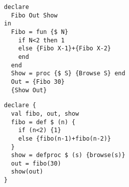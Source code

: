 \begin{lstlisting}[language=oz,label={lst:lstexamplefibooz},title={Fibonacci : a program using recursion and lambdas (\textit{Oz} version)}]
declare
  Fibo Out Show
in
  Fibo = fun {$ N}
    if N<2 then 1
    else {Fibo X-1}+{Fibo X-2}
    end
  end
  Show = proc {$ S} {Browse S} end
  Out = {Fibo 30}
  {Show Out}
\end{lstlisting}
\begin{lstlisting}[language=newoz,label={lst:lstexamplefibonewoz},title={Fibonacci : a program using recursion and lambdas (\textit{NewOz} version)}]
declare {
  val fibo, out, show
  fibo = def $ (n) {
    if (n<2) {1}
    else {fibo(n-1)+fibo(n-2)}
  }
  show = defproc $ (s) {browse(s)}
  out = fibo(30)
  show(out)
}
\end{lstlisting}
